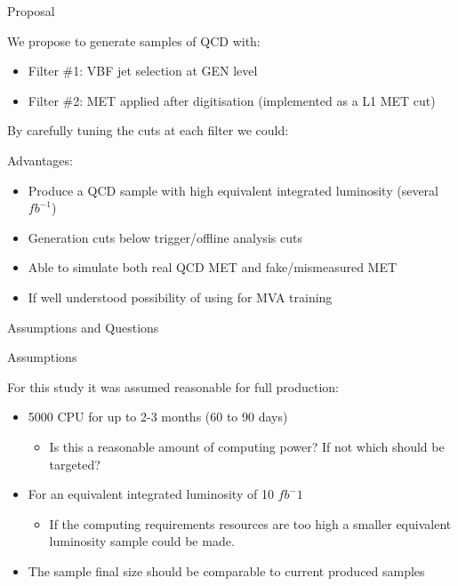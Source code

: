 \documentclass[8pt]{beamer}
\begin{document}
\begin{frame}{Proposal}

We propose to generate samples of QCD with:
\begin{block}

\begin{itemize}
  \item Filter \#1: VBF jet selection at GEN level
  \item Filter \#2: MET applied after digitisation (implemented as a L1 MET cut)
\end{itemize}
  
\end{block}

By carefully tuning the cuts at each filter we could:
\begin{block}{Advantages:}

\begin{itemize}
  \item Produce a QCD sample with high equivalent integrated luminosity (several $fb^{-1}$)
  \item Generation cuts below trigger/offline analysis cuts 
  \item Able to simulate both real QCD MET and fake/mismeasured MET
  \item If well understood possibility of using for MVA training
\end{itemize}

\end{block}

\end{frame}

\begin{frame}{Assumptions and Questions}
  
\begin{block}{Assumptions}

For this study it was assumed reasonable for full production: 

\begin{itemize}
  \item 5000 CPU for up to 2-3 months (60 to 90 days)
  \begin{itemize}
    \item Is this a reasonable amount of computing power? If not which should be targeted? 
  \end{itemize}
  \item For an equivalent integrated luminosity of 10 $fb^-1$
  \begin{itemize}
    \item If the computing requirements resources are too high a smaller equivalent luminosity sample could be made. 
  \end{itemize}
  \item The sample final size should be comparable to current produced samples
\end{itemize}

\end{block}
  
\end{frame}
\end{document}
